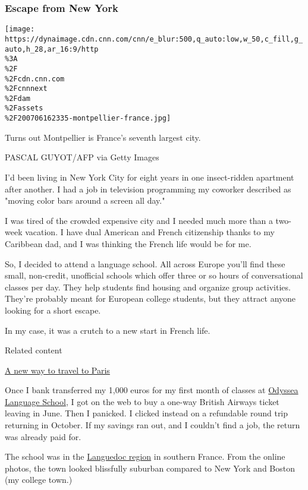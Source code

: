 \hypertarget{escape-from-new-york}{%
\subsubsection{Escape from New York}\label{escape-from-new-york}}

\href{/travel/article/trip-changed-my-life-southern-france/index.html?gallery=6}{}

\texttt{[image: https://dynaimage.cdn.cnn.com/cnn/e\_blur:500,q\_auto:low,w\_50,c\_fill,g\_auto,h\_28,ar\_16:9/http\\\%3A\\\%2F\\\%2Fcdn.cnn.com\\\%2Fcnnnext\\\%2Fdam\\\%2Fassets\\\%2F200706162335-montpellier-france.jpg]}

Turns out Montpellier is France's seventh largest city.

PASCAL GUYOT/AFP via Getty Images

I'd been living in New York City for eight years in one insect-ridden
apartment after another. I had a job in television programming my
coworker described as "moving color bars around a screen all day."

I was tired of the crowded expensive city and I needed much more than a
two-week vacation. I have dual American and French citizenship thanks to
my Caribbean dad, and I was thinking the French life would be for me.

So, I decided to attend a language school. All across Europe you'll find
these small, non-credit, unofficial schools which offer three or so
hours of conversational classes per day. They help students find housing
and organize group activities. They're probably meant for European
college students, but they attract anyone looking for a short escape.

In my case, it was a crutch to a new start in French life.

Related content

\href{/travel/article/escape-to-paris/index.html}{A new way to travel to
Paris}

Once I bank transferred my 1,000 euros for my first month of classes at
\href{https://www.institut-europeen.com/}{Odyssea Language School}, I
got on the web to buy a one-way British Airways ticket leaving in June.
Then I panicked. I clicked instead on a refundable round trip returning
in October. If my savings ran out, and I couldn't find a job, the return
was already paid for.

The school was in the
\href{https://money.cnn.com/gallery/retirement/2015/07/24/retire-abroad/4.html}{Languedoc
region} in southern France. From the online photos, the town looked
blissfully suburban compared to New York and Boston (my college town.)

